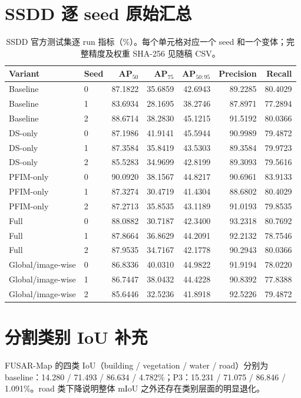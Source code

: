 \documentclass[UTF8,12pt,a4paper]{ctexart}
\begin{document}
\appendix
\section{SSDD 逐 seed 原始汇总}
\begin{table}[H]\centering\scriptsize
\caption{SSDD 官方测试集逐 run 指标（\%）。每个单元格对应一个 seed 和一个变体；完整精度及权重 SHA-256 见随稿 CSV。}
\begin{tabular}{llrrrrr}
\toprule
Variant & Seed & AP$_{50}$ & AP$_{75}$ & AP$_{50:95}$ & Precision & Recall\\
\midrule
Baseline & 0 & 87.1822 & 35.6859 & 42.6943 & 89.2285 & 80.4029\\
Baseline & 1 & 83.6934 & 28.1695 & 38.2746 & 87.8971 & 77.2894\\
Baseline & 2 & 88.6714 & 38.2830 & 45.1215 & 91.5192 & 80.0366\\
DS-only & 0 & 87.1986 & 41.9141 & 45.5944 & 90.9989 & 79.4872\\
DS-only & 1 & 87.3584 & 35.8419 & 43.5303 & 89.3584 & 79.9723\\
DS-only & 2 & 85.5283 & 34.9699 & 42.8199 & 89.3093 & 79.5616\\
PFIM-only & 0 & 90.0920 & 38.1567 & 44.8217 & 90.6961 & 83.9133\\
PFIM-only & 1 & 87.3274 & 30.4719 & 41.4304 & 88.6802 & 80.4029\\
PFIM-only & 2 & 87.2713 & 35.8535 & 43.1189 & 91.0193 & 79.8535\\
Full & 0 & 88.0882 & 30.7187 & 42.3400 & 93.2318 & 80.7692\\
Full & 1 & 87.8664 & 36.8629 & 44.2091 & 92.2132 & 78.7546\\
Full & 2 & 87.9535 & 34.7167 & 42.1778 & 90.2943 & 80.0366\\
Global/image-wise & 0 & 86.8336 & 40.0310 & 44.9822 & 91.9194 & 78.0220\\
Global/image-wise & 1 & 86.7447 & 38.0432 & 44.4228 & 90.8392 & 77.8388\\
Global/image-wise & 2 & 85.6446 & 32.5236 & 41.8918 & 92.5226 & 79.4872\\
\bottomrule
\end{tabular}
\end{table}

\section{分割类别 IoU 补充}
FUSAR-Map 的四类 IoU（building / vegetation / water / road）分别为 baseline：14.280 / 71.493 / 86.634 / 4.782\%；P3：15.231 / 71.075 / 86.846 / 1.091\%。road 类下降说明整体 mIoU 之外还存在类别层面的明显退化。
\end{document}
